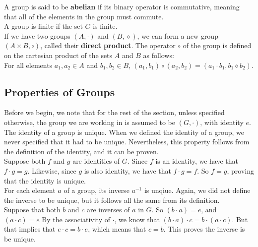 \documentclass[12pt]{article}
\begin{document}
    A group is said to be \textbf{abelian}
    if its binary operator is commutative,
    meaning that all of the elements in the group must commute. \\

    A group is finite if the set $G$ is finite. \\

    If we have two groups $(A, \cdot)$ and $(B, \diamond)$,
    we can form a new group $(A \times B, \circ)$,
    called their \textbf{direct product}.
    The operator $\circ$ of the group is defined on the cartesian product
    of the sets $A$ and $B$ as follows: \\ 
    For all elements $a_1, a_2 \in A$ and $b_1, b_2 \in B$,
    $(a_1, b_1) \circ (a_2, b_2) = (a_1 \cdot b_1, b_1 \diamond b_2)$. \\


    \subsection*{Properties of Groups}

    Before we begin,
    we note that for the rest of the section,
    unless specified otherwise,
    the group we are working in is assumed to be $(G, \cdot)$,
    with identity $e$. \\

    The identity of a group is unique.
    When we defined the identity of a group,
    we never specified that it had to be unique.
    Nevertheless,
    this property follows from the definition of the identity,
    and it can be proven. \\
    Suppose both $f$ and $g$ are identities of $G$.
    Since $f$ is an identity, we have that $f \cdot g = g$.
    Likewise, since $g$ is also identity, we have that $f \cdot g = f$.
    So $f = g$, proving that the identity is unique. \\

    For each element $a$ of a group, its inverse $a^{-1}$ is unqiue.
    Again, we did not define the inverse to be unique,
    but it follows all the same from its definition. \\
    Suppose that both $b$ and $c$ are inverses of $a$ in $G$.
    So $(b \cdot a) = e$, and $(a \cdot c) = e$
    By the associativity of $\cdot$, 
    we know that $(b \cdot a) \cdot c = b \cdot (a \cdot c)$.
    But that implies that $e \cdot c = b \cdot e$,
    which means that $c = b$.
    This proves the inverse is be unique. \\
\end{document}
